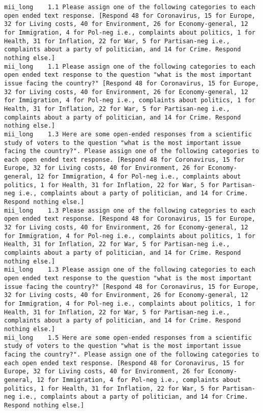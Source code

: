 \begin{lstlisting}[label=lst:promptvariants]
mii_long	1.1	Please assign one of the following categories to each open ended text response. [Respond 48 for Coronavirus, 15 for Europe, 32 for Living costs, 40 for Environment, 26 for Economy-general, 12 for Immigration, 4 for Pol-neg i.e., complaints about politics, 1 for Health, 31 for Inflation, 22 for War, 5 for Partisan-neg i.e., complaints about a party of politician, and 14 for Crime. Respond nothing else.]
mii_long	1.1	Please assign one of the following categories to each open ended text response to the question "what is the most important issue facing the country?" [Respond 48 for Coronavirus, 15 for Europe, 32 for Living costs, 40 for Environment, 26 for Economy-general, 12 for Immigration, 4 for Pol-neg i.e., complaints about politics, 1 for Health, 31 for Inflation, 22 for War, 5 for Partisan-neg i.e., complaints about a party of politician, and 14 for Crime. Respond nothing else.]
mii_long	1.3	Here are some open-ended responses from a scientific study of voters to the question "what is the most important issue facing the country?". Please assign one of the following categories to each open ended text response. [Respond 48 for Coronavirus, 15 for Europe, 32 for Living costs, 40 for Environment, 26 for Economy-general, 12 for Immigration, 4 for Pol-neg i.e., complaints about politics, 1 for Health, 31 for Inflation, 22 for War, 5 for Partisan-neg i.e., complaints about a party of politician, and 14 for Crime. Respond nothing else.]
mii_long	1.3	Please assign one of the following categories to each open ended text response. [Respond 48 for Coronavirus, 15 for Europe, 32 for Living costs, 40 for Environment, 26 for Economy-general, 12 for Immigration, 4 for Pol-neg i.e., complaints about politics, 1 for Health, 31 for Inflation, 22 for War, 5 for Partisan-neg i.e., complaints about a party of politician, and 14 for Crime. Respond nothing else.]
mii_long	1.3	Please assign one of the following categories to each open ended text response to the question "what is the most important issue facing the country?" [Respond 48 for Coronavirus, 15 for Europe, 32 for Living costs, 40 for Environment, 26 for Economy-general, 12 for Immigration, 4 for Pol-neg i.e., complaints about politics, 1 for Health, 31 for Inflation, 22 for War, 5 for Partisan-neg i.e., complaints about a party of politician, and 14 for Crime. Respond nothing else.]
mii_long	1.5	Here are some open-ended responses from a scientific study of voters to the question "what is the most important issue facing the country?". Please assign one of the following categories to each open ended text response. [Respond 48 for Coronavirus, 15 for Europe, 32 for Living costs, 40 for Environment, 26 for Economy-general, 12 for Immigration, 4 for Pol-neg i.e., complaints about politics, 1 for Health, 31 for Inflation, 22 for War, 5 for Partisan-neg i.e., complaints about a party of politician, and 14 for Crime. Respond nothing else.]

\end{lstlisting}
